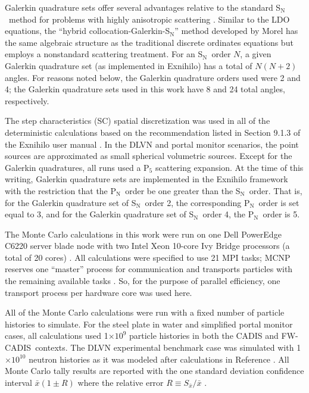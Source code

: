 \documentclass{article} %
\newcommand{\sn}{S$_\mathrm{N}$}
\newcommand{\pn}{P$_\mathrm{N}$}
\newcommand{\xbar}{\ensuremath{\bar{x}}}
\newcommand{\E}[1]{$\times10^{#1}$}
\newcommand{\fwc}{\mbox{FW-CADIS}}
\begin{document}
Galerkin quadrature sets offer several advantages relative to the standard \sn\
method for problems with highly anisotropic scattering \cite{morel}. Similar to
the LDO equations, the ``hybrid collocation-Galerkin-S$_\mathrm{N}$'' method
developed by Morel has the same algebraic structure as the traditional discrete
ordinates equations but employs a nonstandard scattering treatment. For
an \sn\ order $N$, a given Galerkin quadrature set (as implemented in Exnihilo)
has a total of $N(N+2)$ angles. For reasons noted below, the Galerkin quadrature
orders used were 2 and 4; the Galerkin quadrature sets
used in this work have 8 and 24 total angles, respectively.

The step characteristics (SC) spatial discretization was used in all of the
deterministic calculations based on the recommendation listed in Section 9.1.3
of the Exnihilo user manual \cite{exum}. In the DLVN and portal monitor
scenarios, the point sources are approximated as small spherical volumetric
sources. Except for the Galerkin quadratures, all runs used a P$_5$ scattering
expansion. At the time of this writing, Galerkin quadrature sets are
implemented in the Exnihilo framework with the restriction that the \pn\ order
be one greater than the \sn\ order. That is, for the Galerkin quadrature set of
\sn\ order 2, the corresponding \pn\ order is set equal to 3, and for the
Galerkin quadrature set of \sn\ order 4, the \pn\ order is 5.

The Monte Carlo calculations in this work were run on one Dell PowerEdge C6220
server blade node with two Intel Xeon 10-core Ivy Bridge processors (a total of
20 cores) \cite{savio}. All calculations were specified to use 21 MPI tasks; MCNP
reserves one ``master'' process for communication and transports particles with
the remaining available tasks \cite{mcnp}. So, for the purpose of parallel
efficiency, one transport process per hardware core was used here.

All of the Monte Carlo calculations were run with a fixed number of particle 
histories to simulate. For the steel plate in water and simplified portal 
monitor cases, all calculations used 1\E{9} particle histories in both the
CADIS and \fwc\ contexts. The DLVN experimental benchmark case was simulated 
with 1\E{10} neutron histories as it was modeled after calculations in
Reference \cite{sw-dlvn}. All Monte Carlo tally results are reported with the
one standard deviation confidence interval $\xbar(1\pm R)$ where the relative
error $R \equiv S_{\xbar}/\xbar$ \cite{mcnp}.
\end{document}
